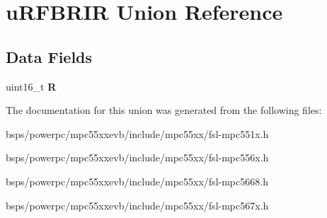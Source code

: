 \hypertarget{unionuRFBRIR}{}\section{u\+R\+F\+B\+R\+IR Union Reference}
\label{unionuRFBRIR}
\subsection*{Data Fields}
\begin{DoxyCompactItemize}
\item 
\mbox{\label{unionuRFBRIR_aae2b12947a105a142bde17cb17d0571f}} 
uint16\+\_\+t {\bfseries R}
\end{DoxyCompactItemize}


The documentation for this union was generated from the following files\+:\begin{DoxyCompactItemize}
\item 
bsps/powerpc/mpc55xxevb/include/mpc55xx/fsl-\/mpc551x.\+h\item 
bsps/powerpc/mpc55xxevb/include/mpc55xx/fsl-\/mpc556x.\+h\item 
bsps/powerpc/mpc55xxevb/include/mpc55xx/fsl-\/mpc5668.\+h\item 
bsps/powerpc/mpc55xxevb/include/mpc55xx/fsl-\/mpc567x.\+h\end{DoxyCompactItemize}
